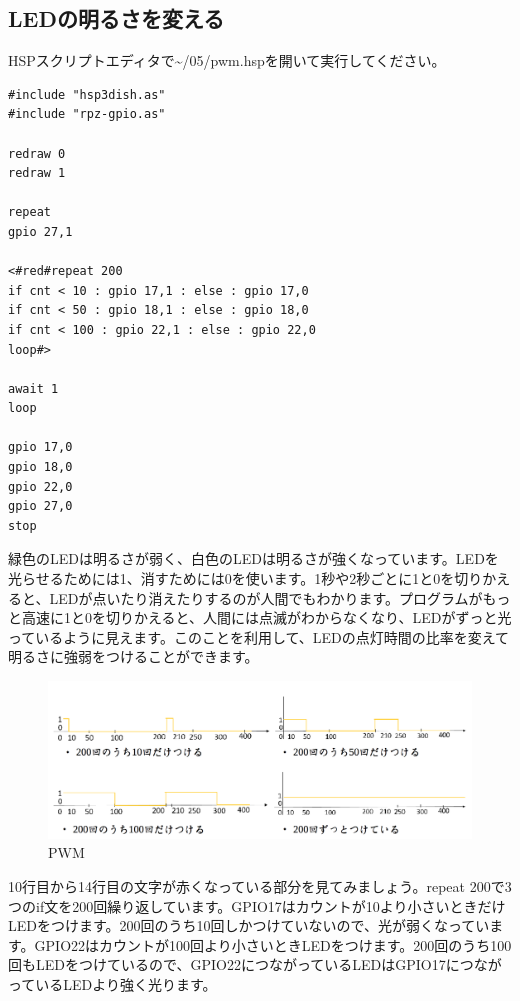 \subsection{LEDの明るさを変える}
HSPスクリプトエディタで\textasciitilde /05/pwm.hspを開いて実行してください。\\

\begin{lstlisting}[caption=pwm.hsp,label=pwm.hsp]
#include "hsp3dish.as"
#include "rpz-gpio.as"

redraw 0
redraw 1

repeat
gpio 27,1

<#red#repeat 200
if cnt < 10 : gpio 17,1 : else : gpio 17,0
if cnt < 50 : gpio 18,1 : else : gpio 18,0
if cnt < 100 : gpio 22,1 : else : gpio 22,0
loop#>

await 1
loop

gpio 17,0
gpio 18,0
gpio 22,0
gpio 27,0
stop

\end{lstlisting}

緑色のLEDは明るさが弱く、白色のLEDは明るさが強くなっています。LEDを光らせるためには1、消すためには0を使います。1秒や2秒ごとに1と0を切りかえると、LEDが点いたり消えたりするのが人間でもわかります。プログラムがもっと高速に1と0を切りかえると、人間には点滅がわからなくなり、LEDがずっと光っているように見えます。このことを利用して、LEDの点灯時間の比率を変えて明るさに強弱をつけることができます。

\begin{figure}[H]
\centering
\includegraphics[scale=0.5]{images/chap05/text05-img035.png}
\caption{PWM}
\end{figure}

10行目から14行目の文字が赤くなっている部分を見てみましょう。repeat 200で3つのif文を200回繰り返しています。GPIO17はカウントが10より小さいときだけLEDをつけます。200回のうち10回しかつけていないので、光が弱くなっています。GPIO22はカウントが100回より小さいときLEDをつけます。200回のうち100回もLEDをつけているので、GPIO22につながっているLEDはGPIO17につながっているLEDより強く光ります。